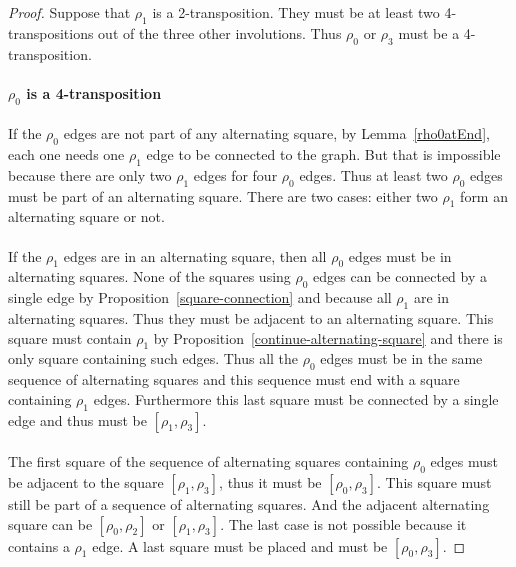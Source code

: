 \begin{proof}
  Suppose that $\rho_1$ is a 2-transposition. They must be at least two 4-transpositions out of the three other involutions. Thus $\rho_0$ or $\rho_3$ must be a 4-transposition.

  \paragraph{}
  \textbf{$\rho_0$ is a 4-transposition}

  \paragraph{}
  If the $\rho_0$ edges are not part of any alternating square, by Lemma~\ref{rho0atEnd}, each one needs one $\rho_1$ edge to be connected to the graph. But that is impossible because there are only two $\rho_1$ edges for four $\rho_0$ edges. Thus at least two $\rho_0$ edges must be part of an alternating square. There are two cases: either two $\rho_1$ form an alternating square or not.

  \paragraph{}
  If the $\rho_1$ edges are in an alternating square, then all $\rho_0$ edges must be in alternating squares. None of the squares using $\rho_0$ edges can be connected by a single edge by Proposition~\ref{square-connection} and because all $\rho_1$ are in alternating squares. Thus they must be adjacent to an alternating square. This square must contain $\rho_1$ by Proposition~\ref{continue-alternating-square} and there is only square containing such edges. Thus all the $\rho_0$ edges must be in the same sequence of alternating squares and this sequence must end with a square containing $\rho_1$ edges. Furthermore this last square must be connected by a single edge and thus must be $[\rho_1, \rho_3]$.

  \paragraph{}
  The first square of the sequence of alternating squares containing $\rho_0$ edges must be adjacent to the square $[\rho_1, \rho_3]$, thus it must be $[\rho_0, \rho_3]$. This square must still be part of a sequence of alternating squares. And the adjacent alternating square can be $[\rho_0, \rho_2]$ or $[\rho_1, \rho_3]$. The last case is not possible because it contains a $\rho_1$ edge. A last square must be placed and must be $[\rho_0, \rho_3]$.



\end{proof}
